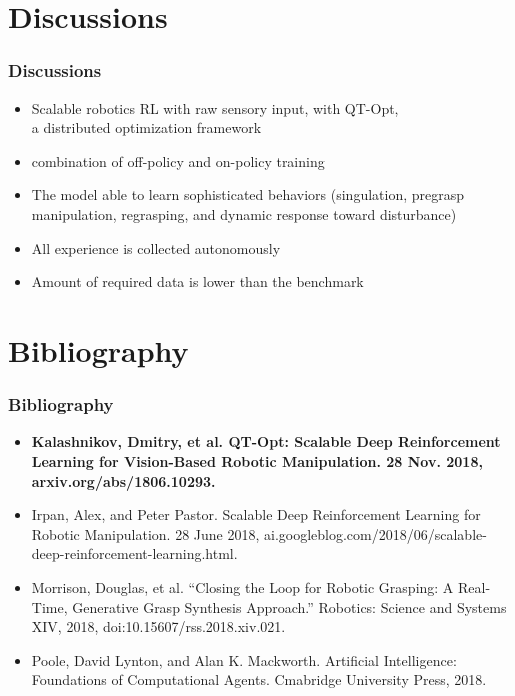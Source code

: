 \documentclass{beamer}
\newcommand{\seventhSec}{Discussions}
\newcommand{\refSec}{Bibliography}
\begin{document}
  \section{\seventhSec}
    \begin{frame}
      \frametitle{\seventhSec}
      \begin{itemize}
        \item Scalable robotics RL with raw sensory input, with QT-Opt, \\ 
              a distributed optimization framework
        \item combination of off-policy and on-policy training
        \item The model able to learn sophisticated behaviors (singulation, pregrasp manipulation, regrasping, and dynamic response toward disturbance)
        \item All experience is collected autonomously
        \item Amount of required data is lower than the benchmark
      \end{itemize}
    \end{frame}


  \section{\refSec}
    \begin{frame}[allowframebreaks]
      \frametitle{\refSec}
      \begin{itemize}
        \item \textbf{Kalashnikov, Dmitry, et al. QT-Opt: Scalable Deep Reinforcement Learning for Vision-Based Robotic Manipulation. 28 Nov. 2018, arxiv.org/abs/1806.10293.}
        \item Irpan, Alex, and Peter Pastor. Scalable Deep Reinforcement Learning for Robotic Manipulation. 28 June 2018, ai.googleblog.com/2018/06/scalable-deep-reinforcement-learning.html.
        \item Morrison, Douglas, et al. “Closing the Loop for Robotic Grasping: A Real-Time, Generative Grasp Synthesis Approach.” Robotics: Science and Systems XIV, 2018, doi:10.15607/rss.2018.xiv.021.
        \item Poole, David Lynton, and Alan K. Mackworth. Artificial Intelligence: Foundations of Computational Agents. Cmabridge University Press, 2018.
      \end{itemize}
    \end{frame}
\end{document}
